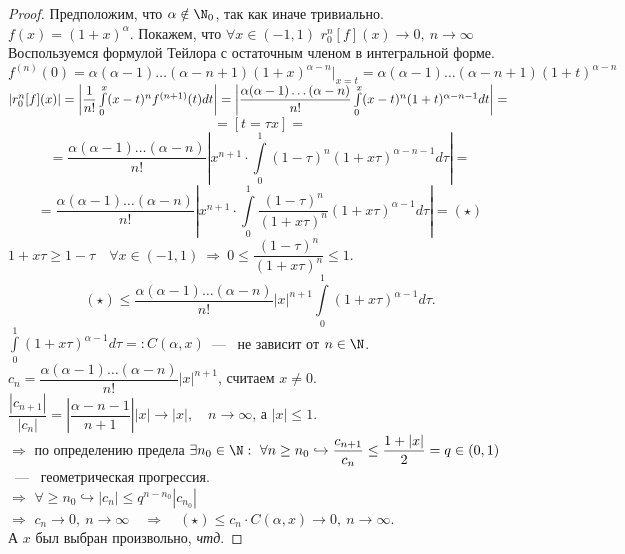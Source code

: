 \begin{proof}
    Предположим, что $\alpha \notin \N_0$, так как иначе тривиально. \\
    $f(x) = (1+x)^{\alpha}$. Покажем, что $\forall x \in (-1, 1)$ $r_0^n[f](x) \to 0, \ n \to \infty$ \\
    Воспользуемся формулой Тейлора с остаточным членом в интегральной форме. \\
    $f^{(n)}(0) = \alpha (\alpha - 1) \dots (\alpha - n + 1) (1+x)^{\alpha - n} |_{x=t} = \alpha (\alpha - 1) \dots (\alpha - n + 1)(1+t)^{\alpha - n}$
    $\left| r_0^n [f](x)\right| = \left| \dfrac{1}{n!} \int \limits_0^x (x-t)^n f^{(n+1)} (t)dt \right| = \left|\dfrac{\alpha(\alpha - 1)\dots(\alpha - n)}{n!} \int \limits_0^x (x-t)^n (1+t)^{\alpha - n - 1} dt \right| = \\ $ 
    $$= [t = \tau x] = $$
    $$= \dfrac{\alpha(\alpha - 1)\dots(\alpha - n)}{n!} \left| x^{n+1} \cdot \int \limits_0^1 (1-\tau)^n (1+x\tau)^{\alpha - n - 1} d\tau \right| = $$ 
    $$ =\dfrac{\alpha(\alpha - 1)\dots(\alpha - n)}{n!} \left| x^{n+1} \cdot \int \limits_0^1 \dfrac{(1-\tau)^n}{(1+x\tau)^n} (1+x\tau)^{\alpha - 1} d\tau \right| = (\star)$$
    $1+x\tau \geq 1 - \tau \quad \forall x \in (-1, 1) \ \Longrightarrow \ 0 \leq \dfrac{(1-\tau)^n}{(1+x\tau)^n} \leq 1.$ \\
    $$ (\star) \leq \dfrac{\alpha(\alpha - 1)\dots(\alpha - n)}{n!} |x|^{n+1} \int \limits_0^1 (1+x\tau)^{\alpha - 1} d\tau.$$
    $\int \limits_0^1 (1+x\tau)^{\alpha - 1} d\tau =: C(\alpha, x)$~---~ не зависит от $n \in \N$. \\
    $c_n = \dfrac{\alpha(\alpha - 1)\dots(\alpha - n)}{n!}  |x|^{n+1}$, считаем $x \neq 0$. \\
    $\dfrac{|c_{n+1}|}{|c_n|} = \left| \dfrac{\alpha - n - 1}{n + 1}\right| |x| \to |x|, \quad n \to \infty$, а $|x| \leq 1$. \\
    $\Longrightarrow$ по определению предела $\exists n_0 \in \N: \ \forall n \geq n_0 \hookrightarrow \dfrac{c_{n+1}}{c_n} \leq \dfrac{1 + |x|}{2} = q \in (0, 1)$~---~ геометрическая прогрессия. \\
    $\Longrightarrow$ $\forall \geq n_0 \hookrightarrow |c_n| \leq q^{n-n_0} |c_{n_0}|$ \\
    $\Longrightarrow$ $c_n \to 0, \ n \to \infty \quad \Longrightarrow \quad (\star) \leq c_n \cdot C(\alpha, x) \to 0, \ n \to \infty$. \\
    А $x$ был выбран произвольно, \textit{чтд}.
\end{proof}

